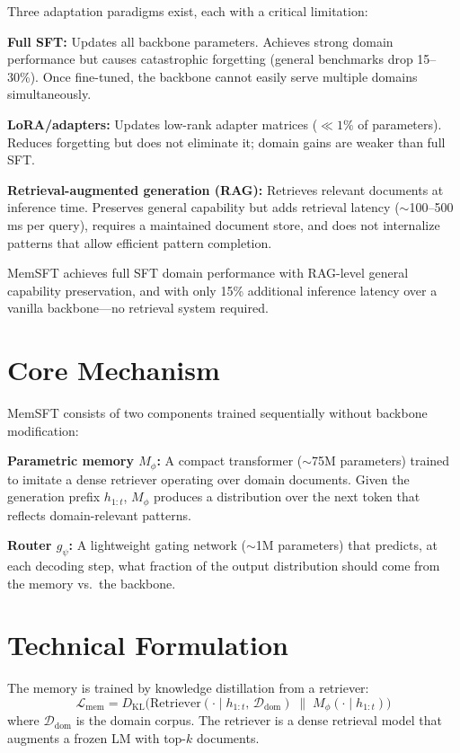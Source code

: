 \documentclass[10pt,twocolumn]{article}
\begin{document}
Three adaptation paradigms exist, each with a critical limitation:

\textbf{Full SFT:} Updates all backbone parameters. Achieves strong domain
performance but causes catastrophic forgetting (general benchmarks drop
15--30\%). Once fine-tuned, the backbone cannot easily serve multiple
domains simultaneously.

\textbf{LoRA/adapters:} Updates low-rank adapter matrices ($\ll 1\%$ of
parameters). Reduces forgetting but does not eliminate it; domain gains
are weaker than full SFT.

\textbf{Retrieval-augmented generation (RAG):} Retrieves relevant documents
at inference time. Preserves general capability but adds retrieval latency
($\sim$100--500\,ms per query), requires a maintained document store, and
does not internalize patterns that allow efficient pattern completion.

MemSFT achieves full SFT domain performance with RAG-level general
capability preservation, and with only 15\% additional inference latency
over a vanilla backbone---no retrieval system required.

\section{Core Mechanism}

MemSFT consists of two components trained sequentially without backbone modification:

\textbf{Parametric memory $M_\phi$:} A compact transformer ($\sim$75M
parameters) trained to imitate a dense retriever operating over domain
documents. Given the generation prefix $h_{1:t}$, $M_\phi$ produces a
distribution over the next token that reflects domain-relevant patterns.

\textbf{Router $g_\psi$:} A lightweight gating network ($\sim$1M parameters)
that predicts, at each decoding step, what fraction of the output
distribution should come from the memory vs.\ the backbone.

\section{Technical Formulation}

The memory is trained by knowledge distillation from a retriever:
\[
  \mathcal{L}_{\text{mem}} = D_{\mathrm{KL}}\!\bigl(
    \mathrm{Retriever}(\cdot \mid h_{1:t},\, \mathcal{D}_{\mathrm{dom}})
    \;\|\;
    M_\phi(\cdot \mid h_{1:t})
  \bigr)
\]
where $\mathcal{D}_{\mathrm{dom}}$ is the domain corpus. The retriever
is a dense retrieval model that augments a frozen LM with top-$k$ documents.
\end{document}
